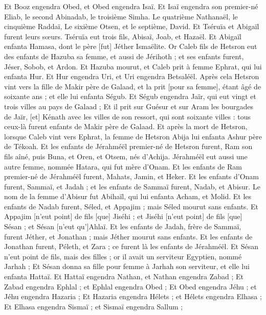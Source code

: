 \begin{multicols}{2}
Et Booz engendra Obed, et Obed engendra Isaï.
Et Isaï engendra son premier-né Eliab, le second Abinadab, le troisième Simha.
Le quatrième Nathanaël, le cinquième Raddaï,
Le sixième Otsen, et le septième, David.
Et Tséruïa et Abigaïl furent leurs sœurs. Tséruïa eut trois fils, Abisaï, Joab, et Hazaël.
Et Abigaïl enfanta Hamasa, dont le père [fut] Jéther Ismaëlite.
Or Caleb fils de Hetsron eut des enfants de Hazuba sa femme, et aussi de Jérihoth ; et ses enfants furent, Jéser, Sobob, et Ardon.
Et Hazuba mourut, et Caleb prit à femme Ephrat, qui lui enfanta Hur.
Et Hur engendra Uri, et Uri engendra Betsaléël.
Après cela Hetsron vint vers la fille de Makir père de Galaad, et la prit [pour sa femme], étant âgé de soixante ans ; et elle lui enfanta Ségub.
Et Ségub engendra Jaïr, qui eut vingt et trois villes au pays de Galaad ;
Et il prit sur Guésur et sur Aram les bourgades de Jaïr, [et] Kénath avec les villes de son ressort, qui sont soixante villes : tous ceux-là furent enfants de Makir père de Galaad.
Et après la mort de Hetsron, lorsque Caleb vint vers Ephrat, la femme de Hetsron Abija lui enfanta Ashur père de Tékoah.
Et les enfants de Jérahméël premier-né de Hetsron furent, Ram son fils aîné, puis Buna, et Oren, et Otsem, nés d'Achija.
Jérahméël eut aussi une autre femme, nommée Hatara, qui fut mère d'Onam.
Et les enfants de Ram premier-né de Jérahméël furent, Mahats, Jamin, et Heker.
Et les enfants d'Onam furent, Sammaï, et Jadah ; et les enfants de Sammaï furent, Nadab, et Abisur.
Le nom de la femme d'Abisur fut Abihaïl, qui lui enfanta Acham, et Molid.
Et les enfants de Nadab furent, Séled, et Appajim ; mais Séled mourut sans enfants.
Et Appajim [n'eut point] de fils [que] Jiséhi ; et Jiséhi [n'eut point] de fils [que] Sésan ; et Sésan [n'eut qu']Ahlaï.
Et les enfants de Jadah, frère de Sammaï, furent Jéther, et Jonathan ; mais Jéther mourut sans enfants.
Et les enfants de Jonathan furent, Péleth, et Zara ; ce furent là les enfants de Jérahméël.
Et Sésan n'eut point de fils, mais des filles ; or il avait un serviteur Egyptien, nommé Jarhah ;
Et Sésan donna sa fille pour femme à Jarhah son serviteur, et elle lui enfanta Hattaï.
Et Hattaï engendra Nathan, et Nathan engendra Zabad ;
Et Zabad engendra Ephlal ; et Ephlal engendra Obed ;
Et Obed engendra Jéhu ; et Jéhu engendra Hazaria ;
Et Hazaria engendra Hélets ; et Hélets engendra Elhasa ;
Et Elhasa engendra Sismaï ; et Sismaï engendra Sallum ;

\end{multicols}
